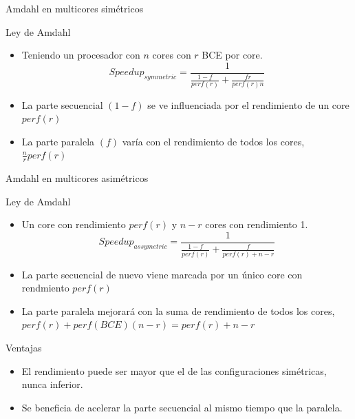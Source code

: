 \documentclass[utf8]{beamer}
\begin{document}
\begin{frame}{Amdahl en multicores simétricos}
    \begin{block}{Ley de Amdahl}
        \begin{itemize}
        \item Teniendo un procesador con $n$ cores con $r$ BCE por core.
        $$ Speedup_{symmetric} = \frac{1}{\frac{1 - f}{perf(r)} + \frac{f  r}{perf(r)  n}} $$
        \item La parte secuencial $(1 - f)$ se ve influenciada por el rendimiento de un core $perf(r)$
        \item La parte paralela $(f)$ varía con el rendimiento de todos los cores, $\frac{n}{r}perf(r)$
        \end{itemize}
    \end{block}
\end{frame}

\begin{frame}[allowframebreaks]{Amdahl en multicores asimétricos}
    \begin{block}{Ley de Amdahl}
        \begin{itemize} 
            \item Un core con rendimiento $perf(r)$ y $n - r$ cores con rendimiento 1.
            $$ Speedup_{assymetric} = \frac{1}{\frac{1 - f}{perf(r)} + \frac{f}{perf(r) + n - r}} $$
            \item La parte secuencial de nuevo viene marcada por un único core con rendmiento $perf(r)$
            \item La parte paralela mejorará con la suma de rendimiento de todos los cores, $perf(r) + perf(BCE) (n - r) = perf(r) + n - r$
        \end{itemize}
    \end{block}
    \begin{block}{Ventajas}
        \begin{itemize}
            \item El rendimiento puede ser mayor que el de las configuraciones simétricas, nunca inferior.
            \item Se beneficia de acelerar la parte secuencial al mismo tiempo que la paralela.
        \end{itemize}
    \end{block}
\end{frame}
\end{document}
